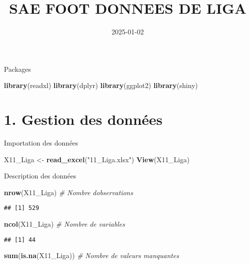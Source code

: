 \documentclass[
]{article}
\title{SAE FOOT DONNEES DE LIGA}
\author{}
\date{\vspace{-2.5em}2025-01-02}
\newenvironment{Shaded}{\begin{snugshade}}{\end{snugshade}}
\newcommand{\CommentTok}[1]{\textcolor[rgb]{0.56,0.35,0.01}{\textit{#1}}}
\newcommand{\FunctionTok}[1]{\textcolor[rgb]{0.13,0.29,0.53}{\textbf{#1}}}
\newcommand{\NormalTok}[1]{#1}
\newcommand{\OtherTok}[1]{\textcolor[rgb]{0.56,0.35,0.01}{#1}}
\newcommand{\StringTok}[1]{\textcolor[rgb]{0.31,0.60,0.02}{#1}}
\begin{document}
\maketitle

Packages

\begin{Shaded}
\begin{Highlighting}[]
\FunctionTok{library}\NormalTok{(readxl)}
\FunctionTok{library}\NormalTok{(dplyr)}
\FunctionTok{library}\NormalTok{(ggplot2)}
\FunctionTok{library}\NormalTok{(shiny)}
\end{Highlighting}
\end{Shaded}

\section{1. Gestion des données}\label{gestion-des-donnuxe9es}

Importation des données

\begin{Shaded}
\begin{Highlighting}[]
\NormalTok{X11\_Liga }\OtherTok{\textless{}{-}} \FunctionTok{read\_excel}\NormalTok{(}\StringTok{"11\_Liga.xlsx"}\NormalTok{)}
\FunctionTok{View}\NormalTok{(X11\_Liga)}
\end{Highlighting}
\end{Shaded}

Description des données

\begin{Shaded}
\begin{Highlighting}[]
\FunctionTok{nrow}\NormalTok{(X11\_Liga)  }\CommentTok{\# Nombre d\textquotesingle{}observations }
\end{Highlighting}
\end{Shaded}

\begin{verbatim}
## [1] 529
\end{verbatim}

\begin{Shaded}
\begin{Highlighting}[]
\FunctionTok{ncol}\NormalTok{(X11\_Liga)  }\CommentTok{\# Nombre de variables}
\end{Highlighting}
\end{Shaded}

\begin{verbatim}
## [1] 44
\end{verbatim}

\begin{Shaded}
\begin{Highlighting}[]
\FunctionTok{sum}\NormalTok{(}\FunctionTok{is.na}\NormalTok{(X11\_Liga))  }\CommentTok{\# Nombre de valeurs manquantes}
\end{Highlighting}
\end{Shaded}
\end{document}
